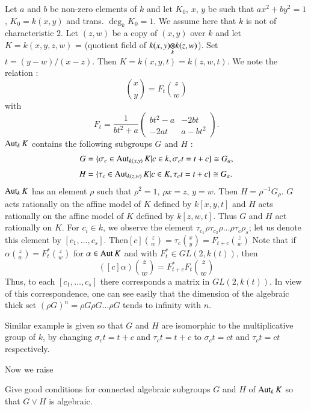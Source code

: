 \begin{example*}
Let $a$ and $b$ be non-zero elements of $k$ and let $K_{0}$, $x$, $y$ be such that $ax^{2}+by^{2}=1$, $K_{0}=k(x,y)$ and trans. $\deg_{k}K_{0}=1$. We assume here that $k$ is not of characteristic $2$. Let $(z,w)$ be a copy of $(x,y)$ over $k$ and let $K=k(x,y,z,w)$ = (quotient field of $\foprod{k(x,y)}{k(z,w)}{k}$). Set $t=(y-w)/(x-z)$. Then $K=k(x,y,t)=k(z,w,t)$. We note the relation :
$$
\binom{x}{y}=F_{t}\binom{z}{w}
$$
with
$$
F_{t}=\frac{1}{bt^{2}+a}\left(\begin{matrix} bt^{2}-a & -2bt\\ -2at & a-bt^{2}\end{matrix}\right).
$$
$\operatorname{\mathrm{Aut}}_{k}K$ contains the following subgroups $G$ and $H$ :
\begin{align*}
G &= \{\sigma_{c}\in \operatorname{\mathrm{Aut}}_{k(x,y)}K | c\in k, \sigma_{c}t=t+c\}\cong G_{a},\\[3pt]
H &= \{\tau_{c}\in \operatorname{\mathrm{Aut}}_{k(z,w)}K | c\in K, \tau_{c}t=t+c\}\cong G_{a}.
\end{align*}
$\operatorname{\mathrm{Aut}}_{k}K$ has an element $\rho$ such that $\rho^{2}=1$, $\rho x=z$, $y=w$. Then $H=\rho^{-1}G_{\rho}$. $G$ acts rationally on the affine model of $K$ defined by $k[x,y,t]$ and $H$ acts rationally on the affine model of $K$ defined by $k[z,w,t]$. Thus $G$ and $H$ act rationally on $K$. For $c_{i}\in k$, we observe the element $\tau_{c_{1}}\rho \tau_{c_{2}}\rho\ldots\rho \tau_{c}\rho_{s}$; let us denote this element by $[c_{1},\ldots,c_{s}]$. Then\pageoriginale $[c]\binom{z}{w}=\tau_{c}\binom{x}{y}=F_{t+c}\binom{z}{w}$ Note that if $\alpha\binom{z}{w}=F^{*}_{t}\binom{z}{w}$ for $\alpha \in \operatorname{\mathrm{Aut}} K$ and with $F^{*}_{t}\in GL(2,k(t))$, then
$$
([c]\alpha)\binom{z}{w}=F^{*}_{t+c}F_{t}\binom{z}{w}
$$
Thus, to each $[c_{1},\ldots,c_{s}]$ there corresponds a matrix in $GL(2,k(t))$. In view of this correspondence, one can see easily that the dimension of the algebraic thick set $(\rho G)^{n}=\rho G\rho G\ldots \rho G$ tends to infinity with $n$.
\end{example*}

\begin{remark}\label{art16-rem2.2}
Similar example is given so that $G$ and $H$ are isomorphic to the multiplicative group of $k$, by changing $\sigma_{c}t=t+c$ and $\tau_{c}t=t+c$ to $\sigma_{c}t=ct$ and $\tau_{c}t=ct$ respectively.
\end{remark}

Now we raise

\begin{question}\label{art16-ques2.3}
Give good conditions for connected algebraic subgroups $G$ and $H$ of $\operatorname{\mathrm{Aut}}_{k}K$ so that $G\vee H$ is algebraic.
\end{question}

